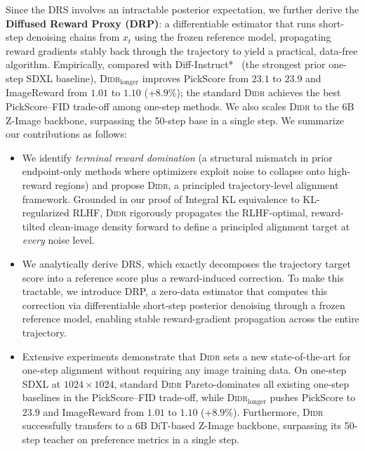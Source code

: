 Since the DRS involves an intractable posterior expectation, we further derive the \textbf{Diffused Reward Proxy (DRP)}: a differentiable estimator that runs short-step denoising chains from $x_t$ using the frozen reference model, propagating reward gradients stably back through the trajectory to yield a practical, data-free algorithm. Empirically, compared with Diff-Instruct*~\citep{luo2024onestep} (the strongest prior one-step SDXL baseline), \textsc{Didr}$_{\text{longer}}$ improves PickScore from $23.1$ to $23.9$ and ImageReward from $1.01$ to $1.10$ ($+8.9\%$); the standard \textsc{Didr} achieves the best PickScore--FID trade-off among one-step methods. We also scales \textsc{Didr} to the 6B Z-Image backbone, surpassing the 50-step base in a single step. We summarize our contributions as follows:
\begin{itemize}[leftmargin=6pt, noitemsep, topsep=2pt]

        \item We identify \emph{terminal reward domination} (a structural mismatch in prior endpoint-only methods where optimizers exploit noise to collapse onto high-reward regions) and propose \textsc{Didr}, a principled trajectory-level alignment framework. Grounded in our proof of Integral KL equivalence to KL-regularized RLHF, \textsc{Didr} rigorously propagates the RLHF-optimal, reward-tilted clean-image density forward to define a principled alignment target at \emph{every} noise level.

    \item We analytically derive {DRS}, which exactly decomposes the trajectory target score into a reference score plus a reward-induced correction. To make this tractable, we introduce {DRP}, a zero-data estimator that computes this correction via differentiable short-step posterior denoising through a frozen reference model, enabling stable reward-gradient propagation across the entire trajectory.

    \item Extensive experiments demonstrate that \textsc{Didr} sets a new state-of-the-art for one-step alignment without requiring any image training data. On one-step SDXL at $1024 \times 1024$, standard \textsc{Didr} Pareto-dominates all existing one-step baselines in the PickScore--FID trade-off, while \textsc{Didr}$_{\text{longer}}$ pushes PickScore to $23.9$ and ImageReward from $1.01$ to $1.10$ ($+8.9\%$). Furthermore, \textsc{Didr} successfully transfers to a 6B DiT-based Z-Image backbone, surpassing its 50-step teacher on preference metrics in a single step.
\end{itemize}
